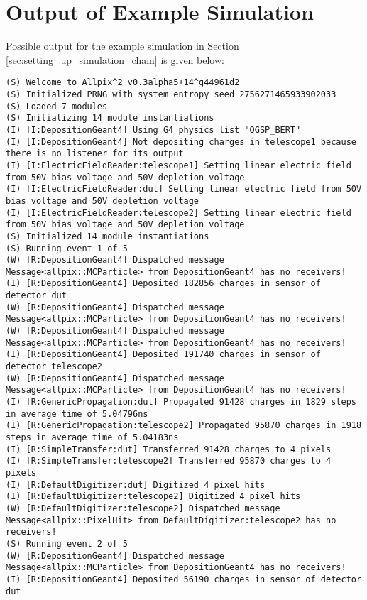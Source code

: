 \section{Output of Example Simulation}
\label{sec:example_output}
Possible output for the example simulation in Section \ref{sec:setting_up_simulation_chain} is given below:

\begin{lstlisting}[breaklines]
(S) Welcome to Allpix^2 v0.3alpha5+14^g44961d2
(S) Initialized PRNG with system entropy seed 2756271465933902033
(S) Loaded 7 modules                    
(S) Initializing 14 module instantiations
(I) [I:DepositionGeant4] Using G4 physics list "QGSP_BERT"
(I) [I:DepositionGeant4] Not depositing charges in telescope1 because there is no listener for its output
(I) [I:ElectricFieldReader:telescope1] Setting linear electric field from 50V bias voltage and 50V depletion voltage
(I) [I:ElectricFieldReader:dut] Setting linear electric field from 50V bias voltage and 50V depletion voltage
(I) [I:ElectricFieldReader:telescope2] Setting linear electric field from 50V bias voltage and 50V depletion voltage
(S) Initialized 14 module instantiations
(S) Running event 1 of 5
(W) [R:DepositionGeant4] Dispatched message Message<allpix::MCParticle> from DepositionGeant4 has no receivers!
(I) [R:DepositionGeant4] Deposited 182856 charges in sensor of detector dut
(W) [R:DepositionGeant4] Dispatched message Message<allpix::MCParticle> from DepositionGeant4 has no receivers!
(W) [R:DepositionGeant4] Dispatched message Message<allpix::MCParticle> from DepositionGeant4 has no receivers!
(I) [R:DepositionGeant4] Deposited 191740 charges in sensor of detector telescope2
(W) [R:DepositionGeant4] Dispatched message Message<allpix::MCParticle> from DepositionGeant4 has no receivers!
(I) [R:GenericPropagation:dut] Propagated 91428 charges in 1829 steps in average time of 5.04796ns
(I) [R:GenericPropagation:telescope2] Propagated 95870 charges in 1918 steps in average time of 5.04183ns
(I) [R:SimpleTransfer:dut] Transferred 91428 charges to 4 pixels
(I) [R:SimpleTransfer:telescope2] Transferred 95870 charges to 4 pixels
(I) [R:DefaultDigitizer:dut] Digitized 4 pixel hits
(I) [R:DefaultDigitizer:telescope2] Digitized 4 pixel hits
(W) [R:DefaultDigitizer:telescope2] Dispatched message Message<allpix::PixelHit> from DefaultDigitizer:telescope2 has no receivers!
(S) Running event 2 of 5
(W) [R:DepositionGeant4] Dispatched message Message<allpix::MCParticle> from DepositionGeant4 has no receivers!
(I) [R:DepositionGeant4] Deposited 56190 charges in sensor of detector dut

\end{lstlisting}
